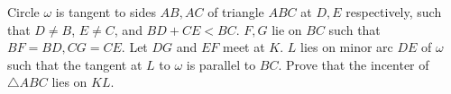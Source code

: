 Circle $\omega$ is tangent to sides $AB,AC$ of triangle $ABC$ at $D,E$ respectively, such that $D\neq B$, $E\neq C$, and $BD+CE<BC$. $F,G$ lie on $BC$ such that $BF=BD,CG=CE$. Let $DG$ and $EF$ meet at $K$. $L$ lies on minor arc $DE$ of $\omega$ such that the tangent at $L$ to $\omega$ is parallel to $BC$. Prove that the incenter of $\triangle{ABC}$ lies on $KL$.